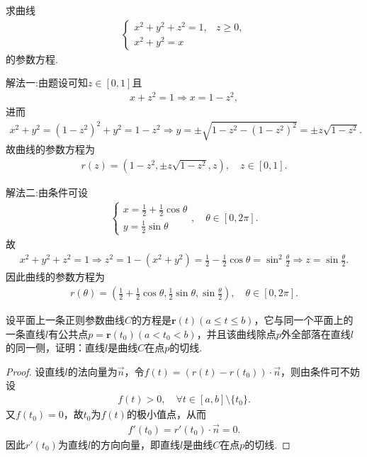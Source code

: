 \documentclass[../../main.tex]{subfiles}%
\begin{document}
\begin{example}
求曲线
\begin{align*}
\begin{cases}
x^2 + y^2 + z^2 = 1, & z \geqslant 0, \\
x^2 + y^2 = x
\end{cases}
\end{align*}
的参数方程.
\end{example}
\begin{solution}

{\color{blue}解法一:}由题设可知$z\in\left[0,1\right]$且\begin{align*}
x+z^2=1\Longrightarrow x=1-z^2,
\end{align*}进而\begin{align*}
x^2+y^2=\left(1-z^2\right)^2+y^2=1-z^2\Longrightarrow y=\pm\sqrt{1-z^2-\left(1-z^2\right)^2}=\pm z\sqrt{1-z^2}.
\end{align*}故曲线的参数方程为\begin{align*}
r(z)=\left(1-z^2,\pm z\sqrt{1-z^2},z\right),\quad z\in\left[0,1\right].
\end{align*}

{\color{blue}解法二:}由条件可设\begin{align*}
\begin{cases}
x=\frac{1}{2}+\frac{1}{2}\cos\theta\\
y=\frac{1}{2}\sin\theta
\end{cases},\quad \theta\in\left[0,2\pi\right].
\end{align*}故\begin{align*}
x^2+y^2+z^2=1\Longrightarrow z^2=1-\left(x^2+y^2\right)=\frac{1}{2}-\frac{1}{2}\cos\theta=\sin^2\frac{\theta}{2}\Longrightarrow z=\sin\frac{\theta}{2}.
\end{align*}因此曲线的参数方程为\begin{align*}
r(\theta)=\left(\frac{1}{2}+\frac{1}{2}\cos\theta,\frac{1}{2}\sin\theta,\sin\frac{\theta}{2}\right),\quad \theta\in\left[0,2\pi\right].
\end{align*}

\end{solution}

\begin{example}
设平面上一条正则参数曲线$C$的方程是$\bm{r}(t)(a \leqslant t \leqslant b)$，它与同一个平面上的一条直线$l$有公共点$p = \bm{r}(t_0)(a < t_0 < b)$，并且该曲线除点$p$外全部落在直线$l$的同一侧，证明：直线$l$是曲线$C$在点$p$的切线.
\end{example}
\begin{proof}

设直线$l$的法向量为$\overrightarrow{n}$，令$f(t)=(r(t)-r(t_0))\cdot\overrightarrow{n}$，则由条件可不妨设\begin{align*}
f(t)>0,\quad \forall t\in[a,b]\setminus\{t_0\}.
\end{align*}
又$f(t_0)=0$，故$t_0$为$f(t)$的极小值点，从而
\begin{align*}
f'(t_0)=r'(t_0)\cdot\overrightarrow{n}=0.
\end{align*}
因此$r'(t_0)$为直线$l$的方向向量，即直线$l$是曲线$C$在点$p$的切线.

\end{proof}
\end{document}
